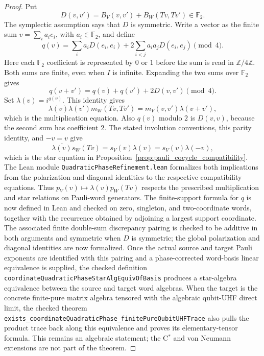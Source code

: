 \documentclass{article}
\begin{document}
\begin{proof}
Put
\begin{equation*}
  D(v,v')=B_V(v,v')+B_W(Tv,Tv')\in\mathbb F_2.
\end{equation*}
The symplectic assumption says that $D$ is symmetric.  Write a vector as the
finite sum $v=\sum_i a_i e_i$, with $a_i\in\mathbb F_2$, and define
\begin{equation*}
  q(v)=\sum_i a_iD(e_i,e_i)
       +2\sum_{i<j}a_i a_jD(e_i,e_j)\pmod 4.
\end{equation*}
Here each $\mathbb F_2$ coefficient is represented by $0$ or $1$ before the
sum is read in $\mathbb Z/4\mathbb Z$.  Both sums are finite, even when $I$ is
infinite.  Expanding the two sums over $\mathbb F_2$ gives
\begin{equation*}
  q(v+v')=q(v)+q(v')+2D(v,v')\pmod 4.
\end{equation*}
Set $\lambda(v)=i^{q(v)}$.  This identity gives
\begin{equation*}
  \lambda(v)\lambda(v')m_W(Tv,Tv')
  =m_V(v,v')\lambda(v+v'),
\end{equation*}
which is the multiplication equation.  Also $q(v)$ modulo $2$ is
$D(v,v)$, because the second sum has coefficient $2$.  The stated involution
conventions, this parity identity, and $-v=v$ give
\begin{equation*}
  \overline{\lambda(v)}s_W(Tv)
  =s_V(v)\lambda(v)=s_V(v)\lambda(-v),
\end{equation*}
which is the star equation in
Proposition~\ref{prop:pauli_cocycle_compatibility}.  The Lean module
\texttt{QuadraticPhaseRefinement.lean} formalizes both implications from the
polarization and diagonal identities to the respective compatibility
equations.  Thus
$p_V(v)\mapsto\lambda(v)p_W(Tv)$ respects the prescribed multiplication and
star relations on Pauli-word generators.  The finite-support formula for $q$
is now defined in Lean and checked on zero, singleton, and two-coordinate
words, together with the recurrence obtained by adjoining a largest support
coordinate.  The associated finite double-sum discrepancy pairing is checked
to be additive in both arguments and symmetric when $D$ is symmetric; the
global polarization and diagonal identities are now formalized.  Once the
actual source and target Pauli exponents are identified with this pairing and
a phase-corrected word-basis linear equivalence is supplied, the checked
definition \texttt{coordinateQuadraticPhaseStarAlgEquivOfBasis} produces a
star-algebra equivalence between the source and target word algebras.  When
the target is the concrete finite-pure matrix algebra tensored with the
algebraic qubit-UHF direct limit, the checked theorem
\texttt{exists\_coordinateQuadraticPhase\_finitePureQubitUHFTrace} also pulls
the product trace back along this equivalence and proves its elementary-tensor
formula.  This remains an algebraic statement; the C$^*$ and von Neumann
extensions are not part of the theorem.
\end{proof}
\end{document}
